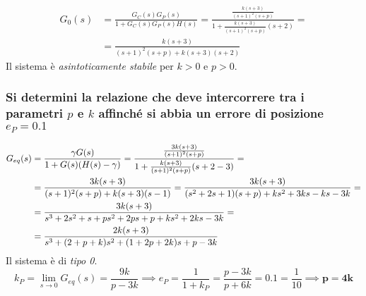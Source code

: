 \begin{align*}
	G_0(s) &= \frac{G_C(s)G_P(s)}{1+G_C(s)G_P(s)H(s)} = \frac{\frac{k(s+3)}{(s+1)^2(s+p)}}{1+\frac{k(s+3)}{(s+1)^2(s+p)}(s+2)} = \\
	&= \frac{k(s+3)}{(s+1)^2(s+p)+k(s+3)(s+2)}
\end{align*}
Il sistema è \emph{asintoticamente stabile} per \(k>0\) e \(p>0\).

\subsubsection{Si determini la relazione che deve intercorrere tra i parametri \(p\) e \(k\) affinché si abbia un errore di posizione \(e_P=0.1\)}

\begin{align*}
G_{eq}(s) &= \frac{\gamma G(s)}{1+G(s)\qty(H(s)-\gamma)} = \frac{\frac{3k(s+3)}{(s+1)^2(s+p)}}{1+\frac{k(s+3)}{(s+1)^2(s+p)}(s+2-3)} = \\
&= \frac{3k(s+3)}{(s+1)^2(s+p)+k(s+3)(s-1)} = \frac{3k(s+3)}{(s^2+2s+1)(s+p)+ks^2+3ks-ks-3k} = \\
&= \frac{3k(s+3)}{s^3+2s^2+s+ps^2+2ps+p+ks^2+2ks-3k} = \\
&= \frac{2k(s+3)}{s^3+(2+p+k)s^2+(1+2p+2k)s+p-3k}
\end{align*}
Il sistema è di \emph{tipo 0}.
\[k_P = \lim_{s\to0} G_{eq}(s)=\frac{9k}{p-3k} \implies e_P=\frac{1}{1+k_P}=\frac{p-3k}{p+6k}=0.1=\frac{1}{10} \implies \bm{p=4k}\]
